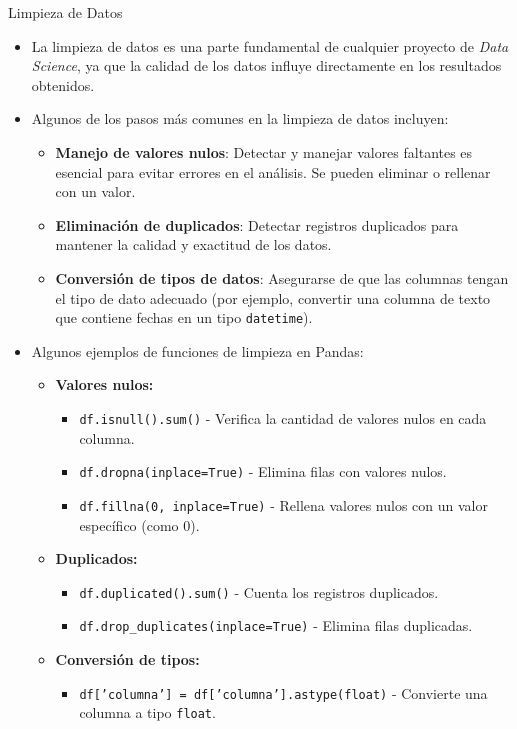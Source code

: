 \documentclass[spanish]{beamer}
\begin{document}
\begin{frame}{Limpieza de Datos}
    \begin{itemize}
        \item La limpieza de datos es una parte fundamental de cualquier proyecto de \textit{Data Science}, ya que la calidad de los datos influye directamente en los resultados obtenidos.
        \item Algunos de los pasos más comunes en la limpieza de datos incluyen:
        \begin{itemize}
            \item \textbf{Manejo de valores nulos}: Detectar y manejar valores faltantes es esencial para evitar errores en el análisis. Se pueden eliminar o rellenar con un valor.
            \item \textbf{Eliminación de duplicados}: Detectar registros duplicados para mantener la calidad y exactitud de los datos.
            \item \textbf{Conversión de tipos de datos}: Asegurarse de que las columnas tengan el tipo de dato adecuado (por ejemplo, convertir una columna de texto que contiene fechas en un tipo \texttt{datetime}).
        \end{itemize}
        \item Algunos ejemplos de funciones de limpieza en Pandas:
        \begin{itemize}
            \item \textbf{Valores nulos:}
            \begin{itemize}
                \item \texttt{df.isnull().sum()} - Verifica la cantidad de valores nulos en cada columna.
                \item \texttt{df.dropna(inplace=True)} - Elimina filas con valores nulos.
                \item \texttt{df.fillna(0, inplace=True)} - Rellena valores nulos con un valor específico (como 0).
            \end{itemize}
            \item \textbf{Duplicados:}
            \begin{itemize}
                \item \texttt{df.duplicated().sum()} - Cuenta los registros duplicados.
                \item \texttt{df.drop\_duplicates(inplace=True)} - Elimina filas duplicadas.
            \end{itemize}
            \item \textbf{Conversión de tipos:}
            \begin{itemize}
                \item \texttt{df['columna'] = df['columna'].astype(float)} - Convierte una columna a tipo \texttt{float}.
            \end{itemize}
        \end{itemize}
    \end{itemize}
\end{frame}
\end{document}
